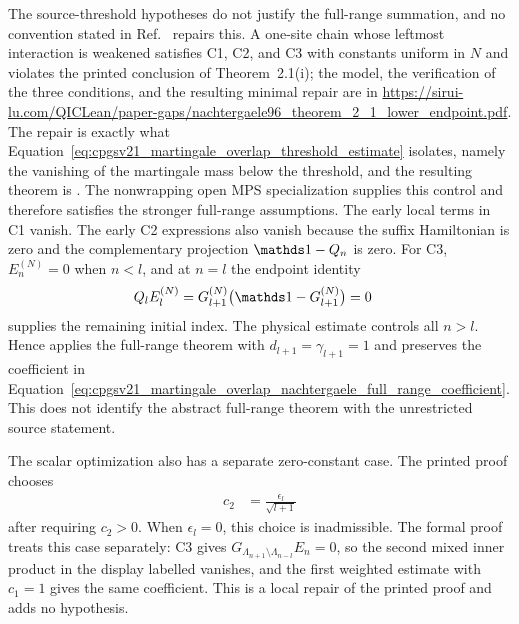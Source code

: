 \documentclass{article}
\begin{document}
The source-threshold hypotheses do not justify the full-range summation, and
no convention stated in Ref.~\cite{Nachtergaele1996Spectral} repairs this.
A one-site chain whose leftmost interaction is weakened satisfies C1, C2, and
C3 with constants uniform in $N$ and violates the printed conclusion of
Theorem~2.1(i); the model, the verification of the three conditions, and the
resulting minimal repair are in
\url{https://sirui-lu.com/QICLean/paper-gaps/nachtergaele96_theorem_2_1_lower_endpoint.pdf}. The
repair is exactly what
Equation~\eqref{eq:cpgsv21_martingale_overlap_threshold_estimate} isolates,
namely the vanishing of the martingale mass below the threshold, and the
resulting theorem is
.
The nonwrapping open MPS specialization supplies this control and
therefore satisfies the stronger full-range assumptions. The early local
terms in C1 vanish. The early C2 expressions also vanish because the suffix
Hamiltonian is zero and the complementary projection $\Id-Q_n$ is zero. For
C3, $E_n^{(N)}=0$ when $n<l$, and at $n=l$ the endpoint identity
\begin{align}
    Q_lE_l^{(N)}
     & =G_{l+1}^{(N)}\bigl(\Id-G_{l+1}^{(N)}\bigr)=0
    \label{eq:cpgsv21_martingale_overlap_lower_endpoint_open_discharge}
\end{align}
supplies the remaining initial index. The physical estimate controls all
$n>l$. Hence
applies the full-range theorem with $d_{l+1}=\gamma_{l+1}=1$ and preserves the
coefficient in
Equation~\eqref{eq:cpgsv21_martingale_overlap_nachtergaele_full_range_coefficient}.
This does not identify the abstract full-range theorem with the unrestricted
source statement.

The scalar optimization also has a separate zero-constant case. The printed
proof chooses
\begin{align}
    c_2
     & =\frac{\epsilon_l}{\sqrt{l+1}}
    \label{eq:cpgsv21_martingale_overlap_nachtergaele_c2_weight}
\end{align}
after requiring $c_2>0$. When $\epsilon_l=0$, this choice is inadmissible.
The formal proof treats this case separately: C3 gives
$G_{\Lambda_{n+1}\setminus\Lambda_{n-l}}E_n=0$, so the second mixed inner
product in the display labelled  vanishes, and the first weighted
estimate with $c_1=1$ gives the same coefficient. This is a local repair of
the printed proof and adds no hypothesis.
\end{document}
